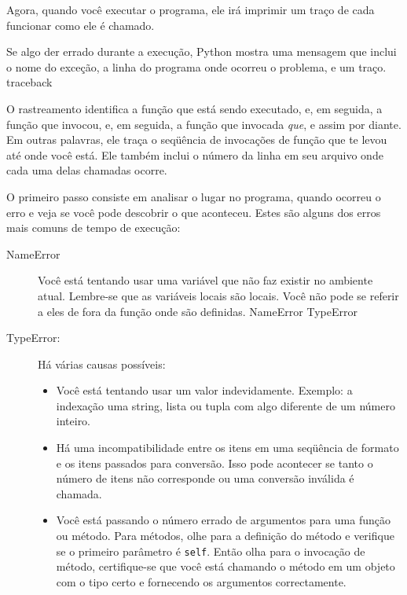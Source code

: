 \documentclass[10pt]{book}
\begin{document}
\begin{v erbatim}
Agora, quando você executar o programa, ele irá imprimir um traço de cada
funcionar como ele é chamado.



Se algo der errado durante a execução, Python
mostra uma mensagem que inclui o nome do
exceção, a linha do programa onde ocorreu o problema,
e um traço.
\index{} traceback

O rastreamento identifica a função que está sendo executado,
e, em seguida, a função que invocou, e, em seguida, a função que
invocada {\em que}, e assim por diante. Em outras palavras, ele traça o
seqüência de invocações de função que te levou até onde você está. Ele
também inclui o número da linha em seu arquivo onde cada uma delas
chamadas ocorre.

O primeiro passo consiste em analisar o lugar no programa, quando
ocorreu o erro e veja se você pode descobrir o que aconteceu.
Estes são alguns dos erros mais comuns de tempo de execução:

\begin{description}

\item[NameError] Você está tentando usar uma variável que não faz
existir no ambiente atual.
Lembre-se que as variáveis ​​locais são locais. Você
não pode se referir a eles de fora da função onde são definidas.
\index{} NameError
\index{} TypeError

\item[TypeError:] Há várias causas possíveis:

\begin{itemize}

\item Você está tentando usar um valor indevidamente. Exemplo: a indexação
uma string, lista ou tupla com algo diferente de um número inteiro.

\item Há uma incompatibilidade entre os itens em uma seqüência de formato e
os itens passados ​​para conversão. Isso pode acontecer se tanto o número
de itens não corresponde ou uma conversão inválida é chamada.

\item Você está passando o número errado de argumentos para uma função ou método.
Para métodos, olhe para a definição do método e
verifique se o primeiro parâmetro é {\tt self}. Então olha para o
invocação de método, certifique-se que você está chamando o método em um
objeto com o tipo certo e fornecendo os argumentos
correctamente.


\end{itemize}
\end{description}
\end{v erbatim}
\end{document}
